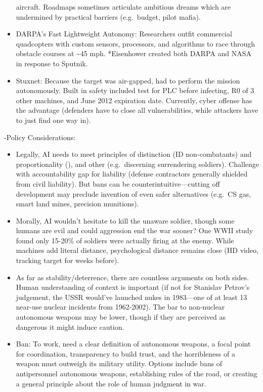 \documentclass[
]{article}
\begin{document}
\begin{itemize}
  aircraft. Roadmaps sometimes articulate ambitious dreams which are
  undermined by practical barriers (e.g.~budget, pilot mafia).
\item
  DARPA's Fast Lightweight Autonomy: Researchers outfit commercial
  quadcopters with custom sensors, processors, and algorithms to race
  through obstacle courses at \textasciitilde45 mph. *Eisenhower created
  both DARPA and NASA in response to Sputnik.
\item
  Stuxnet: Because the target was air-gapped, had to perform the mission
  autonomously. Built in safety included test for PLC before infecting,
  R0 of 3 other machines, and June 2012 expiration date. Currently,
  cyber offense has the advantage (defenders have to close all
  vulnerabilities, while attackers have to just find one way in).
\end{itemize}

-Policy Considerations:

\begin{itemize}
\item
  Legally, AI needs to meet principles of distinction (ID
  non-combatants) and proportionality (), and other (e.g.~discerning
  surrendering soldiers). Challenge with accountability gap for
  liability (defense contractors generally shielded from civil
  liability). But bans can be counterintuitive---cutting off development
  may preclude invention of even safer alternatives (e.g.~CS gas, smart
  land mines, precision munitions).
\item
  Morally, AI wouldn't hesitate to kill the unaware soldier, though some
  humans are evil and could aggression end the war sooner? One WWII
  study found only 15-20\% of soldiers were actually firing at the
  enemy. While machines add literal distance, psychological distance
  remains close (HD video, tracking target for weeks before).
\item
  As far as stability/deterrence, there are countless arguments on both
  sides. Human understanding of context is important (if not for
  Stanislav Petrov's judgement, the USSR would've launched nukes in
  1983---one of at least 13 near-use nuclear incidents from 1962-2002).
  The bar to non-nuclear autonomous weapons may be lower, though if they
  are perceived as dangerous it might induce caution.
\item
  Ban: To work, need a clear definition of autonomous weapons, a focal
  point for coordination, transparency to build trust, and the
  horribleness of a weapon must outweigh its military utility. Options
  include bans of antipersonnel autonomous weapons, establishing rules
  of the road, or creating a general principle about the role of human
  judgment in war.
\end{itemize}
\end{document}
